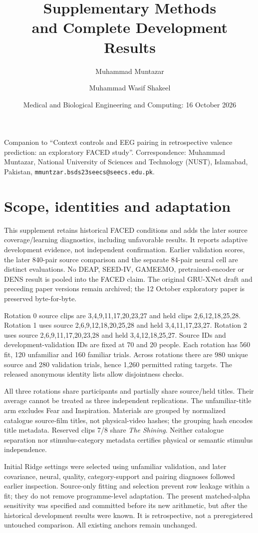 \documentclass[10pt,a4paper]{article}
\title{Supplementary Methods\\and Complete Development Results}
\author{Muhammad Muntazar \and Muhammad Wasif Shakeel}
\date{Medical and Biological Engineering and Computing: 16 October 2026}
\begin{document}
\maketitle
Companion to ``Context controls and EEG pairing in retrospective valence prediction: an exploratory FACED study''. Correspondence: Muhammad Muntazar, National University of Sciences and Technology (NUST), Islamabad, Pakistan, \nolinkurl{mmuntzar.bsds23seecs@seecs.edu.pk}.


\section{Scope, identities and adaptation}
This supplement retains historical FACED conditions and adds the later source coverage/learning diagnostics, including unfavorable results. It reports adaptive development evidence, not independent confirmation. Earlier validation scores, the later 840-pair source comparison and the separate 84-pair neural cell are distinct evaluations. No DEAP, SEED-IV, GAMEEMO, pretrained-encoder or DENS result is pooled into the FACED claim. The original GRU-XNet draft and preceding paper versions remain archived; the 12 October exploratory paper is preserved byte-for-byte.

Rotation 0 source clips are 3,4,9,11,17,20,23,27 and held clips 2,6,12,18,25,28. Rotation 1 uses source 2,6,9,12,18,20,25,28 and held 3,4,11,17,23,27. Rotation 2 uses source 2,6,9,11,17,20,23,28 and held 3,4,12,18,25,27. Source IDs and development-validation IDs are fixed at 70 and 20 people. Each rotation has 560 fit, 120 unfamiliar and 160 familiar trials. Across rotations there are 980 unique source and 280 validation trials, hence 1,260 permitted rating targets. The released anonymous identity lists allow disjointness checks.

All three rotations share participants and partially share source/held titles. Their average cannot be treated as three independent replications. The unfamiliar-title arm excludes Fear and Inspiration. Materials are grouped by normalized catalogue source-film titles, not physical-video hashes; the grouping hash encodes title metadata. Reserved clips 7/8 share \emph{The Shining}. Neither catalogue separation nor stimulus-category metadata certifies physical or semantic stimulus independence.

Initial Ridge settings were selected using unfamiliar validation, and later covariance, neural, quality, category-support and pairing diagnoses followed earlier inspection. Source-only fitting and selection prevent row leakage within a fit; they do not remove programme-level adaptation. The present matched-alpha sensitivity was specified and committed before its new arithmetic, but after the historical development results were known. It is retrospective, not a preregistered untouched comparison. All existing anchors remain unchanged.
\end{document}
